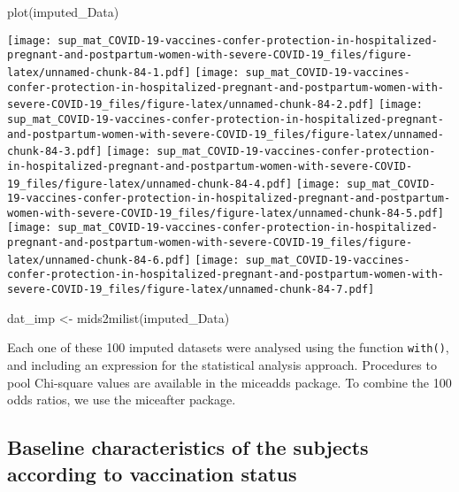 \documentclass[
]{article}
\newenvironment{Shaded}{\begin{snugshade}}{\end{snugshade}}
\newcommand{\FunctionTok}[1]{\textcolor[rgb]{0.00,0.00,0.00}{#1}}
\newcommand{\NormalTok}[1]{#1}
\newcommand{\OtherTok}[1]{\textcolor[rgb]{0.56,0.35,0.01}{#1}}
\begin{document}
\begin{Shaded}
\begin{Highlighting}[]
\FunctionTok{plot}\NormalTok{(imputed\_Data)}
\end{Highlighting}
\end{Shaded}

\texttt{[image: sup\_mat\_COVID-19-vaccines-confer-protection-in-hospitalized-pregnant-and-postpartum-women-with-severe-COVID-19\_files/figure-latex/unnamed-chunk-84-1.pdf]}
\texttt{[image: sup\_mat\_COVID-19-vaccines-confer-protection-in-hospitalized-pregnant-and-postpartum-women-with-severe-COVID-19\_files/figure-latex/unnamed-chunk-84-2.pdf]}
\texttt{[image: sup\_mat\_COVID-19-vaccines-confer-protection-in-hospitalized-pregnant-and-postpartum-women-with-severe-COVID-19\_files/figure-latex/unnamed-chunk-84-3.pdf]}
\texttt{[image: sup\_mat\_COVID-19-vaccines-confer-protection-in-hospitalized-pregnant-and-postpartum-women-with-severe-COVID-19\_files/figure-latex/unnamed-chunk-84-4.pdf]}
\texttt{[image: sup\_mat\_COVID-19-vaccines-confer-protection-in-hospitalized-pregnant-and-postpartum-women-with-severe-COVID-19\_files/figure-latex/unnamed-chunk-84-5.pdf]}
\texttt{[image: sup\_mat\_COVID-19-vaccines-confer-protection-in-hospitalized-pregnant-and-postpartum-women-with-severe-COVID-19\_files/figure-latex/unnamed-chunk-84-6.pdf]}
\texttt{[image: sup\_mat\_COVID-19-vaccines-confer-protection-in-hospitalized-pregnant-and-postpartum-women-with-severe-COVID-19\_files/figure-latex/unnamed-chunk-84-7.pdf]}

\begin{Shaded}
\begin{Highlighting}[]
\NormalTok{dat\_imp }\OtherTok{\textless{}{-}} \FunctionTok{mids2milist}\NormalTok{(imputed\_Data)}
\end{Highlighting}
\end{Shaded}

Each one of these 100 imputed datasets were analysed using the function
\texttt{with()}, and including an expression for the statistical
analysis approach. Procedures to pool Chi-square values are available in
the miceadds package. To combine the 100 odds ratios, we use the
miceafter package.

\hypertarget{baseline-characteristics-of-the-subjects-according-to-vaccination-status}{%
\subsection{Baseline characteristics of the subjects according to
vaccination
status}\label{baseline-characteristics-of-the-subjects-according-to-vaccination-status}}
\end{document}
